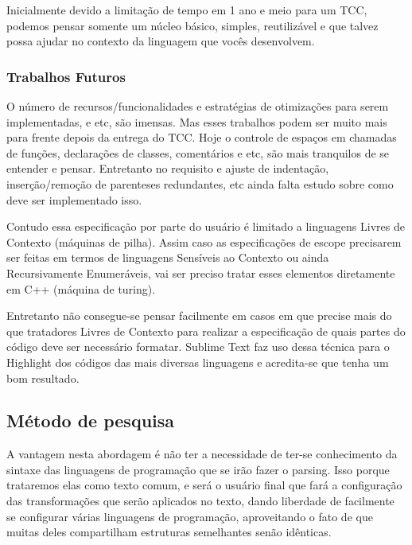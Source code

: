 \begin{englishtext}
\begin{enumerate}[leftmargin=*]
        Inicialmente devido a limitação de tempo em 1 ano e meio para um TCC, podemos pensar somente
        um núcleo básico, simples, reutilizável e que talvez possa ajudar no contexto da linguagem
        que vocês desenvolvem.

    \end{enumerate}


\subsubsection{Trabalhos Futuros}

    O número de recursos/funcionalidades e estratégias de otimizações para serem implementadas, e
    etc, são imensas. Mas esses trabalhos podem ser muito mais para frente depois da entrega do TCC.
    Hoje o controle de espaços em chamadas de funções, declarações de classes, comentários e etc,
    são mais tranquilos de se entender e pensar. Entretanto no requisito e ajuste de indentação,
    inserção/remoção de parenteses redundantes, etc ainda falta estudo sobre como deve ser
    implementado isso.

    Contudo essa especificação por parte do usuário é limitado a linguagens Livres de Contexto
    (máquinas de pilha). Assim caso as especificações de escope precisarem ser feitas em termos de
    linguagens Sensíveis ao Contexto ou ainda Recursivamente Enumeráveis, vai ser preciso tratar
    esses elementos diretamente em C++ (máquina de turing).

    Entretanto não consegue-se pensar facilmente em casos em que precise mais do que tratadores
    Livres de Contexto para realizar a especificação de quais partes do código deve ser necessário
    formatar. Sublime Text faz uso dessa técnica para o Highlight dos códigos das mais diversas
    linguagens e acredita-se que tenha um bom resultado.





\subsection{Método de pesquisa}

    A vantagem nesta abordagem é não ter a necessidade de ter-se conhecimento da sintaxe das
    linguagens de programação que se irão fazer o parsing. Isso porque trataremos elas como texto
    comum, e será o usuário final que fará a configuração das transformações que serão aplicados no
    texto, dando liberdade de facilmente se configurar várias linguagens de programação,
    aproveitando o fato de que muitas deles compartilham estruturas semelhantes senão idênticas.


\end{englishtext}
